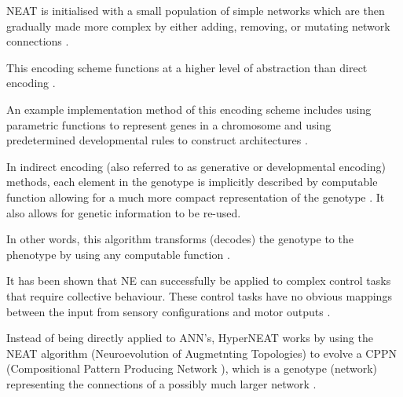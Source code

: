 NEAT is initialised with a small population of simple networks which are then gradually made more complex by either adding, removing, or mutating network connections \cite{RefWorks:11, Gomez2003}.



This encoding scheme functions at a higher level of abstraction than direct encoding  \cite{Gomez2003}.

An example implementation method of this encoding scheme includes using parametric functions to represent genes in a chromosome and using predetermined developmental rules to construct architectures \cite{koutnik2010evolving}.

In indirect encoding (also referred to as generative or developmental encoding) methods, each element in the genotype is implicitly described by computable function allowing for a much more compact representation of the genotype \cite{clune2011performance, stanley2009hypercube}. It also allows for genetic information to be re-used.

In other words, this algorithm transforms (decodes) the genotype to the phenotype by using any computable function \cite{koutnik2010evolving}.


It has been shown that NE can successfully be applied to complex control tasks that require collective behaviour. These control tasks have no obvious mappings between the input from sensory configurations and motor outputs \cite{NitschkeSaEC2012}.


Instead of being directly applied to ANN's, HyperNEAT works by using the NEAT algorithm (Neuroevolution of Augmetnting Topologies) to evolve a CPPN (Compositional Pattern Producing Network \cite{StanleyMiikkulainen2002}), which is a genotype (network) representing the connections of a possibly much larger network \cite{RefWorks:14}.

